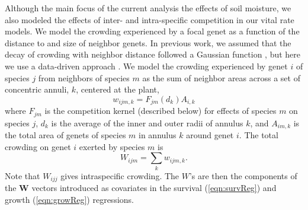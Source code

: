\documentclass[11pt]{article}
\begin{document}
\begin{doublespacing}
Although the main focus of the current analysis the effects of soil moisture, we also modeled the effects of inter- and intra-specific competition in our vital rate models.  We model the crowding experienced by a focal genet as a function of the distance to and size of neighbor genets. In previous work, we assumed that the decay of crowding with neighbor distance followed a Gaussian function \citep{chu_large_2015}, but here we use a data-driven approach \citep{teller_linking_2016, adler_in_prep}. We model the crowding experienced by genet $i$ of species $j$ from neighbors of species $m$ as the sum of neighbor areas across a set of concentric annuli, $k$, centered at the plant,
\begin{equation}
w_{ijm,k} = F_{jm}(d_{k})A_{i,k}     
\label{eqn:wik}
\end{equation}
where $F_{jm}$ is the competition kernel (described below) for effects of species $m$ on species $j$, 
$d_{k}$ is the average of the inner and outer radii of annulus $k$, 
and $A_{im,k}$ is the total area of genets of species $m$ in annulus $k$ around genet $i$. The total crowding on 
genet $i$ exerted by species $m$ is
\begin{equation}
W_{ijm}  =\sum_k {w_{ijm,k}} .
\label{eqn:wijm}
\end{equation} 
Note that $W_{ijj}$ gives intraspecific crowding. The $W$'s are then the components of the $\boldsymbol{W}$ vectors introduced as covariates in the survival (\ref{eqn:survReg}) and growth (\ref{eqn:growReg}) regressions.


\end{doublespacing}
\end{document}
